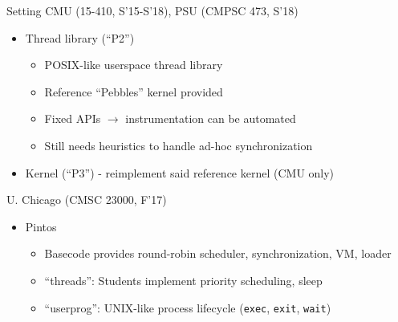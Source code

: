 \documentclass[xcolor=dvipsnames]{beamer}
\begin{document}
\begin{frame}{Setting}
	CMU (15-410, S'15-S'18), PSU (CMPSC 473, S'18)
	\begin{itemize}
		\item Thread library (``P2'')
			\begin{itemize}
				\item POSIX-like userspace thread library %
				\item Reference ``Pebbles'' kernel provided
				\item Fixed APIs $\rightarrow$ instrumentation can be automated
				\item Still needs heuristics to handle ad-hoc synchronization
			\end{itemize}
		\item Kernel (``P3'') - reimplement said reference kernel (CMU only)
	\end{itemize}
	\pause
	\linegap

	U. Chicago (CMSC 23000, F'17)
	\begin{itemize}
		\item Pintos %
		\begin{itemize}
			\item Basecode provides round-robin scheduler, synchronization, VM, loader
			\item ``threads'': Students implement priority scheduling, sleep

			\item ``userprog'': UNIX-like process lifecycle
				({\tt exec}, %
				{\tt exit}, {\tt wait})
		\end{itemize}
	\end{itemize}
\end{frame}
\end{document}
